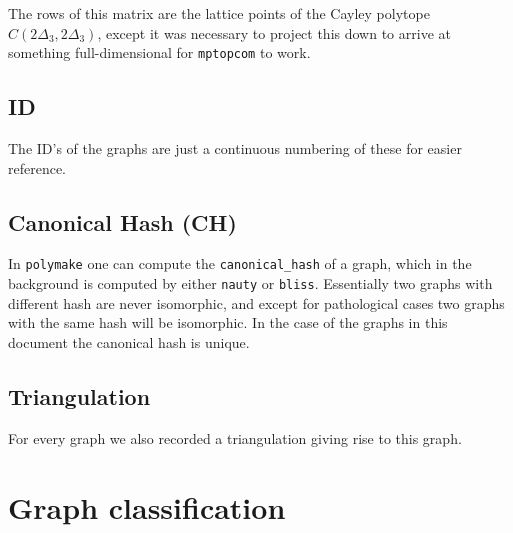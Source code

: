 \documentclass[a4paper, DIV=17, twocolumn]{scrartcl}
\begin{document}
The rows of this matrix are the lattice points of the Cayley polytope
$C(2\Delta_3, 2\Delta_3)$, except it was necessary to project this down to
arrive at something full-dimensional for \texttt{mptopcom} to work.

\subsection{ID}
The ID's of the graphs are just a continuous numbering of these for easier
reference.

\subsection{Canonical Hash (CH)}
In \texttt{polymake} one can compute the \texttt{canonical\_hash} of a graph,
which in the background is computed by either \texttt{nauty} or \texttt{bliss}.
Essentially two graphs with different hash are never isomorphic, and except for
pathological cases two graphs with the same hash will be isomorphic. In the
case of the graphs in this document the canonical hash is unique.

\subsection{Triangulation}
For every graph we also recorded a triangulation giving rise to this graph.

\section{Graph classification}
\setlength{\parindent}{0pt}

\end{document}
